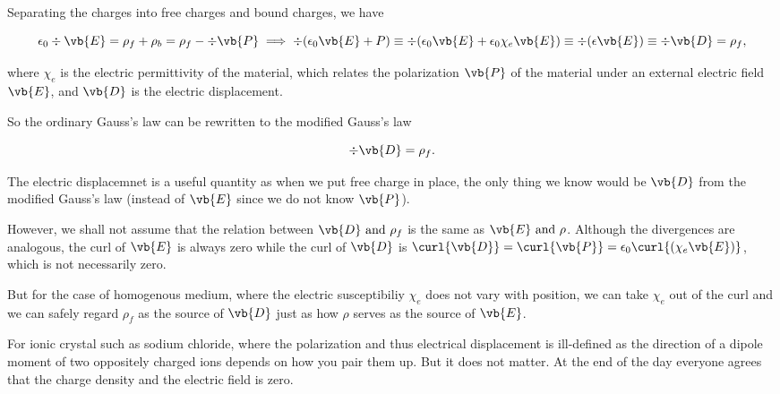 \documentclass[english,a4paper,12pt]{report}
\begin{document}
Separating the charges into free charges and bound charges, we have

\begin{equation}
    \epsilon_0 \div{\vb{E} } = \rho _{f} + \rho _{b} = \rho _{f} - \div{\vb{P} }  \implies  \div{(\epsilon_0 \vb{E} +P)} \equiv \div{(\epsilon_0 \vb{E} + \epsilon_0 \chi _{e}\vb{E}  )} \equiv \div{(\epsilon \vb{E}) } \equiv  \div{\vb{D} } = \rho _{f},
\end{equation}

where \(\chi _{e} \) is the electric permittivity of the material, which relates the polarization \(\vb{P} \) of the material under an external electric field \(\vb{E} \), and \(\vb{D} \) is the electric displacement.    

So the ordinary Gauss's law can be rewritten to the modified Gauss's law

\begin{equation}
    \div{\vb{D} } = \rho _{f}. 
\end{equation}

The electric displacemnet is a useful quantity as when we put free charge in place, the only thing we know would be \(\vb{D} \) from the modified Gauss's law (instead of \(\vb{E} \) since we do not know \(\vb{P} \)).

However, we shall not assume that the relation between \(\vb{D} \text { and } \rho _{f} \) is the same as \(\vb{E} \text { and } \rho \). Although the divergences are analogous, the curl of \(\vb{E} \) is always zero while the curl of \(\vb{D} \) is \(\curl{\vb{D} } = \curl{\vb{P} } = \epsilon _{0}  \curl{(\chi _{e} \vb{E})}  \), which is not necessarily zero.

But for the case of homogenous medium, where the electric susceptibiliy \(\chi _{e} \) does not vary with position, we can take \(\chi _{e} \) out of the curl and we can safely regard \(\rho _{f} \) as the source of \(\vb{D} \) just as how \(\rho \) serves as the source of \(\vb{E} \).        

For ionic crystal such as sodium chloride, where the polarization and thus electrical displacement is ill-defined as the direction of a dipole moment of two oppositely charged ions depends on how you pair them up. But it does not matter. At the end of the day everyone agrees that the charge density and the electric field is zero.  
\end{document}
